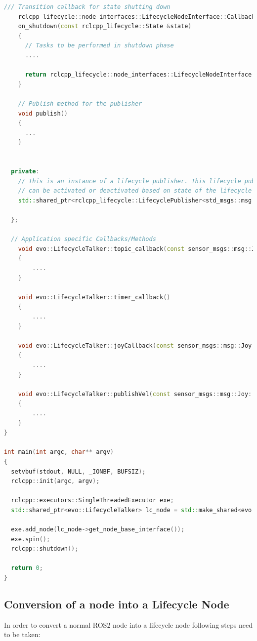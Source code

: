 \begin{lstlisting}[language=cpp]
    /// Transition callback for state shutting down
    rclcpp_lifecycle::node_interfaces::LifecycleNodeInterface::CallbackReturn
    on_shutdown(const rclcpp_lifecycle::State &state)
    {
      // Tasks to be performed in shutdown phase
      ....

      return rclcpp_lifecycle::node_interfaces::LifecycleNodeInterface::CallbackReturn::SUCCESS;
    }

	// Publish method for the publisher
	void publish()
    { 
      ...
    }

    
  private:
    // This is an instance of a lifecycle publisher. This lifecycle publisher
    // can be activated or deactivated based on state of the lifecycle node
    std::shared_ptr<rclcpp_lifecycle::LifecyclePublisher<std_msgs::msg::String>> pub_;

  };

  // Application specific Callbacks/Methods
    void evo::LifecycleTalker::topic_callback(const sensor_msgs::msg::Joy::SharedPtr msg) const
    {
      	....
    }

    void evo::LifecycleTalker::timer_callback()
    {
		....
    }

    void evo::LifecycleTalker::joyCallback(const sensor_msgs::msg::Joy::SharedPtr msg)
    {
		....
    }

    void evo::LifecycleTalker::publishVel(const sensor_msgs::msg::Joy::SharedPtr msg)
    {
		....
    }
}

int main(int argc, char** argv)
{
  setvbuf(stdout, NULL, _IONBF, BUFSIZ);
  rclcpp::init(argc, argv);

  rclcpp::executors::SingleThreadedExecutor exe;
  std::shared_ptr<evo::LifecycleTalker> lc_node = std::make_shared<evo::LifecycleTalker>("lifecycle_joytovel");

  exe.add_node(lc_node->get_node_base_interface());
  exe.spin();
  rclcpp::shutdown();

  return 0;
}


\end{lstlisting}


\subsection{Conversion of a node into a Lifecycle Node}
In order to convert a normal ROS2 node into a lifecycle node following steps need to be taken:

